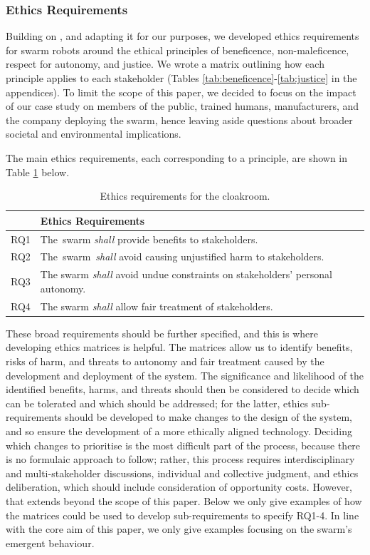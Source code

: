 \documentclass[lettersize,journal]{IEEEtran}
\begin{document}
\subsubsection{Ethics Requirements}
Building on \cite{Porter2022}, and adapting it for our purposes, we developed ethics requirements for swarm robots around the ethical principles of beneficence, non-maleficence, respect for autonomy, and justice. We wrote a matrix outlining how each principle applies to each stakeholder (Tables  \ref{tab:beneficence}-\ref{tab:justice} in the appendices). To limit the scope of this paper, we decided to focus on the impact of our case study on members of the public, trained humans, manufacturers, and the company deploying the swarm, hence leaving aside questions about broader societal and environmental implications.

The main ethics requirements, each corresponding to a principle, are shown in Table \ref{tab:ethics} below. 
\begin{table}[!h]
	\centering
	\begin{tabular}{|p{9mm}|p{72mm}|}
		\hline
		& \textbf{ Ethics Requirements} \\
		\hline
		RQ1 & The swarm \textit{shall} provide benefits to stakeholders. \\ 
		\hline
		RQ2 & The swarm \textit{shall} avoid causing unjustified harm to stakeholders. \\ 
		\hline
		RQ3 & The swarm \textit{shall} avoid undue constraints on stakeholders' personal autonomy. \\
		\hline
		RQ4 & The swarm \textit{shall} allow fair treatment of stakeholders.  \\		[1ex] 		
		\hline
	\end{tabular}
	\caption{\label{tab:ethics}Ethics requirements for the cloakroom.}
\end{table}  

These broad requirements should be further specified, and this is where developing ethics matrices is helpful. The matrices allow us to identify benefits, risks of harm, and threats to autonomy and fair treatment caused by the development and deployment of the system. The significance and likelihood of the identified benefits, harms, and threats should then be considered to decide which can be tolerated and which should be addressed; for the latter, ethics sub-requirements should be developed to make changes to the design of the system, and so ensure the development of a more ethically aligned technology. Deciding which changes to prioritise is the most difficult part of the process, because there is no formulaic approach to follow; rather, this process requires interdisciplinary and multi-stakeholder discussions, individual and collective judgment, and ethics deliberation, which should include consideration of opportunity costs. However, that extends beyond the scope of this paper. Below we only give examples of how the matrices could be used to develop sub-requirements to specify RQ1-4. In line with the core aim of this paper, we only give examples focusing on the swarm's emergent behaviour.
\\
\end{document}
